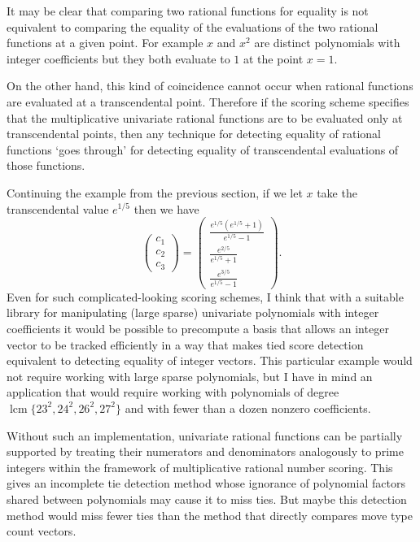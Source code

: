 \documentclass{article}
\DeclareMathOperator{\lcm}{lcm}
\begin{document}
It may be clear that comparing two rational functions for equality
is not equivalent to comparing the equality of the evaluations
of the two rational functions at a given point.
For example $x$ and $x^2$ are distinct polynomials with integer coefficients
but they both evaluate to $1$ at the point $x=1$.

On the other hand, this kind of coincidence cannot occur
when rational functions are evaluated at a transcendental point.
Therefore if the scoring scheme specifies that the
multiplicative univariate rational functions are to be evaluated
only at transcendental points, then any technique for detecting
equality of rational functions `goes through' for detecting
equality of transcendental evaluations of those functions.

Continuing the example from the previous section,
if we let $x$ take the transcendental value $e^{1/5}$
then we have
%
\begin{equation*}
\begin{pmatrix*}
c_1 \\
c_2 \\
c_3
\end{pmatrix*}
=
\begin{pmatrix*}
\frac{e^{1/5} \left( e^{1/5} + 1 \right)}{e^{1/5} - 1} \\
\frac{e^{2/5}}{e^{1/5} + 1} \\
\frac{e^{3/5}}{e^{1/5} - 1}
\end{pmatrix*}.
\end{equation*}
%
Even for such complicated-looking scoring schemes,
I think that with a suitable library for manipulating
(large sparse) univariate polynomials with integer coefficients
it would be possible to
precompute a basis that allows an integer vector to be
tracked efficiently in a way that makes tied score detection
equivalent to detecting equality of integer vectors.
This particular example would not require working with large
sparse polynomials,
but I have in mind an application that would require
working with polynomials of degree $\lcm{\{23^2, 24^2, 26^2, 27^2\}}$
and with fewer than a dozen nonzero coefficients.

Without such an implementation,
univariate rational functions can be partially supported
by treating their numerators and denominators
analogously to prime integers within the framework of
multiplicative rational number scoring.
This gives an incomplete tie detection method whose ignorance
of polynomial factors shared between polynomials
may cause it to miss ties.
But maybe this detection method would miss fewer ties
than the method that directly compares move type count vectors.
\end{document}
